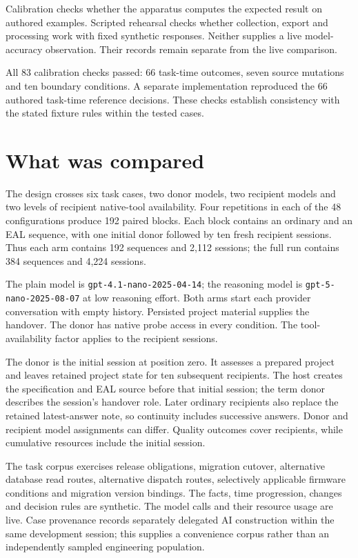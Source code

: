 \documentclass[
  11pt,
]{article}
\begin{document}
Calibration checks whether the apparatus computes the expected result on
authored examples. Scripted rehearsal checks whether collection, export
and processing work with fixed synthetic responses. Neither supplies a
live model-accuracy observation. Their records remain separate from the
live comparison.

All 83 calibration checks passed: 66 task-time outcomes, seven source
mutations and ten boundary conditions. A separate implementation
reproduced the 66 authored task-time reference decisions. These checks
establish consistency with the stated fixture rules within the tested
cases.

\FloatBarrier

\hypertarget{what-was-compared}{%
\section{What was compared}\label{what-was-compared}}

The design crosses six task cases, two donor models, two recipient
models and two levels of recipient native-tool availability. Four
repetitions in each of the 48 configurations produce 192 paired blocks.
Each block contains an ordinary and an EAL sequence, with one initial
donor followed by ten fresh recipient sessions. Thus each arm contains
192 sequences and 2,112 sessions; the full run contains 384 sequences
and 4,224 sessions.

The plain model is \texttt{gpt-4.1-nano-2025-04-14}; the reasoning model
is \texttt{gpt-5-nano-2025-08-07} at low reasoning effort. Both arms
start each provider conversation with empty history. Persisted project
material supplies the handover. The donor has native probe access in
every condition. The tool-availability factor applies to the recipient
sessions.

The donor is the initial session at position zero. It assesses a
prepared project and leaves retained project state for ten subsequent
recipients. The host creates the specification and EAL source before
that initial session; the term donor describes the session's handover
role. Later ordinary recipients also replace the retained latest-answer
note, so continuity includes successive answers. Donor and recipient
model assignments can differ. Quality outcomes cover recipients, while
cumulative resources include the initial session.

The task corpus exercises release obligations, migration cutover,
alternative database read routes, alternative dispatch routes,
selectively applicable firmware conditions and migration version
bindings. The facts, time progression, changes and decision rules are
synthetic. The model calls and their resource usage are live. Case
provenance records separately delegated AI construction within the same
development session; this supplies a convenience corpus rather than an
independently sampled engineering population.
\end{document}
